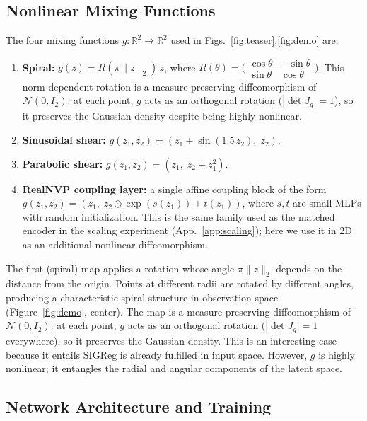 \subsection{Nonlinear Mixing Functions}
The four mixing functions $g: \mathbb{R}^2 \to \mathbb{R}^2$ used in Figs.~\ref{fig:teaser},\ref{fig:demo} are:
\begin{enumerate}
    \item \textbf{Spiral:} $g(z) = R(\pi\|z\|_2)\, z$, where $R(\theta) = \bigl(\begin{smallmatrix} \cos\theta & -\sin\theta \\ \sin\theta & \cos\theta \end{smallmatrix}\bigr)$. This norm-dependent rotation is a measure-preserving diffeomorphism of $\mathcal{N}(0, I_2)$: at each point, $g$ acts as an orthogonal rotation ($|\det J_g| = 1$), so it preserves the Gaussian density despite being highly nonlinear.
    \item \textbf{Sinusoidal shear:} $g(z_1, z_2) = (z_1 + \sin(1.5\,z_2),\; z_2)$.
    \item \textbf{Parabolic shear:} $g(z_1, z_2) = (z_1,\; z_2 + z_1^2)$.
    \item \textbf{RealNVP coupling layer:} a single affine coupling block \citep{dinh2016density} of the form $g(z_1, z_2) = (z_1,\; z_2 \odot \exp(s(z_1)) + t(z_1))$, where $s, t$ are small MLPs with random initialization. This is the same family used as the matched encoder in the scaling experiment (App.~\ref{app:scaling}); here we use it in 2D as an additional nonlinear diffeomorphism.
\end{enumerate}

The first (spiral) map applies a rotation whose angle $\pi\|z\|_2$ depends on the distance from the origin. Points at different radii are rotated by different angles, producing a characteristic spiral structure in observation space (Figure~\ref{fig:demo}, center). The map is a measure-preserving diffeomorphism of $\mathcal{N}(0, I_2)$: at each point, $g$ acts as an orthogonal rotation ($|\det J_g| = 1$ everywhere), so it preserves the Gaussian density. This is an interesting case because it entails SIGReg is already fulfilled in input space. However, $g$ is highly nonlinear; it entangles the radial and angular components of the latent space.

\subsection{Network Architecture and Training}

